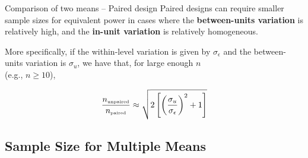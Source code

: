 \begin{frame}{Comparison of two means -- Paired design}
Paired designs can require smaller sample sizes for equivalent power in cases where the {\bf between-units variation} is relatively high, and the {\bf in-unit variation} is relatively homogeneous.\bigskip

More specifically, if the within-level variation is given by $\sigma_\epsilon$ and the between-units variation is $\sigma_u$, we have that, for large enough $n$\\(e.g., $n\geq 10$),

\begin{equation*}
\frac{n_{\mbox{\tiny unpaired}}}{n_{\mbox{\tiny paired}}}\approx\sqrt{2\left[\left(\frac{\sigma_u}{\sigma_\epsilon}\right)^2+1\right]}
\end{equation*}
\end{frame}


%
%
%
%
%

\subsection{Sample Size for Multiple Means}

